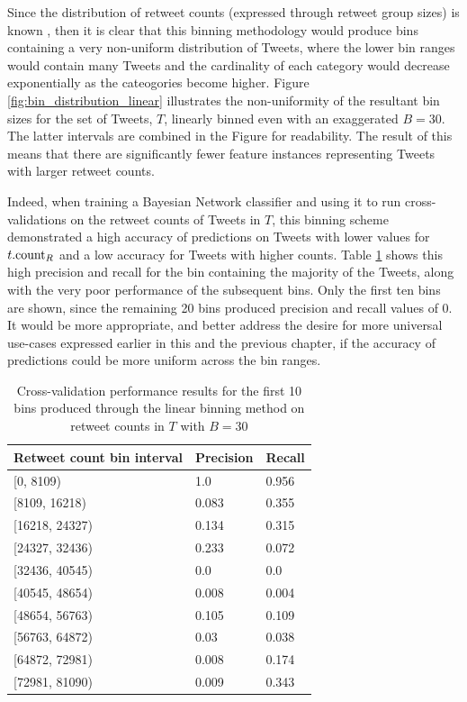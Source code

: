 Since the distribution of retweet counts (expressed through retweet group sizes) is known \cite{webberley11}, then it is clear that this binning methodology would produce bins containing a very non-uniform distribution of Tweets, where the lower bin ranges would contain many Tweets and the cardinality of each category would decrease exponentially as the cateogories become higher. Figure \ref{fig:bin_distribution_linear} illustrates the non-uniformity of the resultant bin sizes for the set of Tweets, $T$, linearly binned even with an exaggerated $B = 30$. The latter intervals are combined in the Figure for readability. The result of this means that there are significantly fewer feature instances representing Tweets with larger retweet counts.

Indeed, when training a Bayesian Network classifier and using it to run cross-validations on the retweet counts of Tweets in $T$, this binning scheme demonstrated a high accuracy of predictions on Tweets with lower values for $t.\textrm{count}_R$ and a low accuracy for Tweets with higher counts. Table \ref{table:linear_bin_performance} shows this high precision and recall for the bin containing the majority of the Tweets, along with the very poor performance of the subsequent bins. Only the first ten bins are shown, since the remaining 20 bins produced precision and recall values of 0. It would be more appropriate, and better address the desire for more universal use-cases expressed earlier in this and the previous chapter, if the accuracy of predictions could be more uniform across the bin ranges.

\begin{table}[h]\footnotesize
\begin{center}
\begin{tabular}{ l | l | l }
	Retweet count bin interval	& Precision & Recall \\
	\hline
	\hline 
    {[0, 8109)}        &   1.0     &   0.956\\
    {[8109, 16218)}    &   0.083   &   0.355\\
    {[16218, 24327)}  &   0.134   &   0.315\\
    {[24327, 32436)}  &   0.233   &   0.072\\
    {[32436, 40545)}  &   0.0       &   0.0\\ 
    {[40545, 48654)}  &   0.008   &   0.004\\
    {[48654, 56763)}  &   0.105   &   0.109\\
    {[56763, 64872)}  &   0.03    &   0.038\\
    {[64872, 72981)}  &   0.008   &   0.174\\
    {[72981, 81090)}  &   0.009   &   0.343\\
    \hline  
\end{tabular}
\end{center}
\caption{Cross-validation performance results for the first 10 bins produced through the linear binning method on retweet counts in $T$ with $B=30$}
\label{table:linear_bin_performance}
\end{table}

